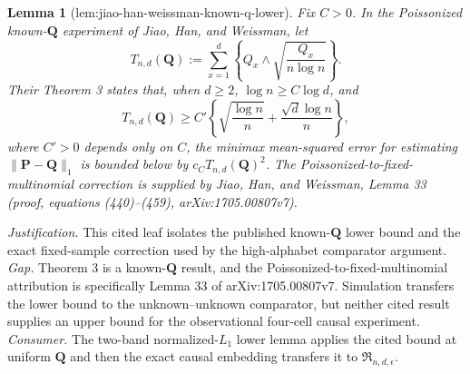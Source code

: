 \documentclass{article}
\newtheorem{lemma}{Lemma}
\begin{document}
\begin{lemma}[lem:jiao-han-weissman-known-q-lower]\label{lem:jiao-han-weissman-known-q-lower}
Fix \(C>0\).  In the Poissonized known-\(\mathbf Q\) experiment of Jiao, Han, and Weissman, let
\[
 T_{n,d}(\mathbf Q)
 :=\sum_{x=1}^d\left\{Q_x\wedge\sqrt{\frac{Q_x}{n\log n}}\right\}.
\]
Their Theorem 3 states that, when \(d\ge2\), \(\log n\ge C\log d\), and
\[
 T_{n,d}(\mathbf Q)
 \ge C'\left\{\sqrt{\frac{\log n}{n}}+\frac{\sqrt d\log n}{n}\right\},
\]
where \(C'>0\) depends only on \(C\), the minimax mean-squared error for estimating \(\lVert\mathbf P-\mathbf Q\rVert_1\) is bounded below by \(c_C T_{n,d}(\mathbf Q)^2\).  The Poissonized-to-fixed-multinomial correction is supplied by Jiao, Han, and Weissman, Lemma 33 (proof, equations (440)--(459), arXiv:1705.00807v7).
\end{lemma}
\par\smallskip\noindent \textit{Justification.} This cited leaf isolates the published known-\(\mathbf Q\) lower bound and the exact fixed-sample correction used by the high-alphabet comparator argument. \textit{Gap.} Theorem 3 is a known-\(\mathbf Q\) result, and the Poissonized-to-fixed-multinomial attribution is specifically Lemma 33 of arXiv:1705.00807v7. Simulation transfers the lower bound to the unknown--unknown comparator, but neither cited result supplies an upper bound for the observational four-cell causal experiment. \textit{Consumer.} The two-band normalized-\(L_1\) lower lemma applies the cited bound at uniform \(\mathbf Q\) and then the exact causal embedding transfers it to \(\mathfrak R_{n,d,\epsilon}\).
\end{document}
